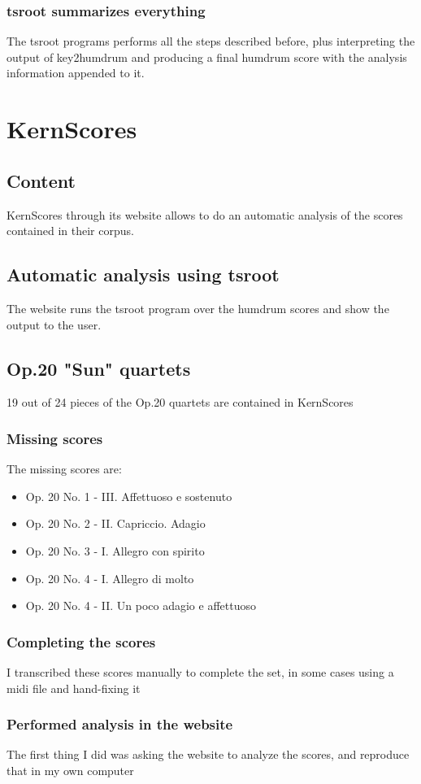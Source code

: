   \subsubsection{tsroot summarizes everything}
    The tsroot programs performs all the steps described before, plus interpreting the output of key2humdrum and producing a final humdrum score with the analysis information appended to it.
\section{KernScores}
  \subsection{Content}
  KernScores through its website allows to do an automatic analysis of the scores contained in their corpus.
  \subsection{Automatic analysis using tsroot}
  The website runs the tsroot program over the humdrum scores and show the output to the user.
  \subsection{Op.20 "Sun" quartets}
    19 out of 24 pieces of the Op.20 quartets are contained in KernScores
    \subsubsection{Missing scores}
    The missing scores are:
    \begin{itemize}
      \item Op. 20 No. 1 - III. Affettuoso e sostenuto
      \item Op. 20 No. 2 - II. Capriccio. Adagio
      \item Op. 20 No. 3 - I. Allegro con spirito
      \item Op. 20 No. 4 - I. Allegro di molto
      \item Op. 20 No. 4 - II. Un poco adagio e affettuoso
    \end{itemize}
    \subsubsection{Completing the scores}
    I transcribed these scores manually to complete the set, in some cases using a midi file and hand-fixing it
    \subsubsection{Performed analysis in the website}
    The first thing I did was asking the website to analyze the scores, and reproduce that in my own computer


\newpage

